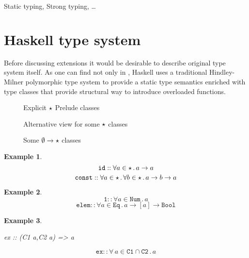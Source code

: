 \documentclass[11pt,oneside,draft]{fithesis2}
\newtheorem{example}{Example}
\begin{document}
Static typing, Strong typing, \dots

\section{Haskell type system}

Before discussing extensions it would be desirable to describe
original type system itself.
As one can find not only in \cite{haskell2010}, Haskell uses a traditional
Hindley-Milner polymorphic type system to provide a static type
semantics enriched with type classes that provide structural way to
introduce overloaded functions.

\noindent
\begin{figure}
	\centering
	\scalebox{0.9}{  }
	\caption{Explicit \(\star\) Prelude classes}
\end{figure}

\noindent
\begin{figure}
	\centering
	\scalebox{1.0}{  }
	\caption{Alternative view for some \(\star\) classes}
\end{figure}

\noindent
\begin{figure}
	\centering
	\scalebox{1.0}{  }
	\caption{Some \(\emptyset \to \star\) classes}
\end{figure}

\begin{example}~
\[ \texttt{id} :: \forall a \in {\star} \, . \, a \to a \]
\[ \texttt{const} :: \forall a \in {\star} \, . \, \forall b \in {\star} \, . \, a \to b \to a \]
\end{example}

\begin{example}~
\[ \texttt{1} :: \forall a \in \texttt {Num} \, . \, a \]
\[ \texttt{elem} :: \forall a \in \texttt{Eq} \, . \, a \to [a] \to \texttt{Bool} \]
\end{example}

\begin{example}~
\begin{code}
ex :: (C1 a,C2 a) => a
\end{code}
\[ \texttt{ex} :: \forall \, a \in \texttt{C1} \cap \texttt{C2} \, . \, a \]
\end{example}
\end{document}
